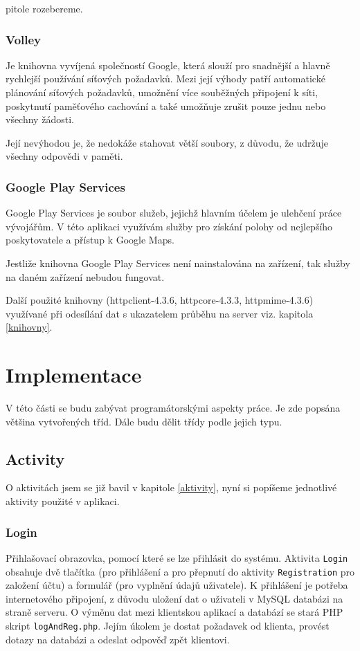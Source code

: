 \documentclass[12pt]{article}
\begin{document}
pitole rozebereme.
\subsubsection{Volley}
\label{volley}
Je knihovna vyvíjená společností Google, která slouží pro snadnější a hlavně rychlejší používání síťových požadavků. Mezi její výhody patří automatické plánování síťových požadavků, umožnění více souběžných připojení k síti, poskytnutí paměťového cachování a také umožňuje zrušit pouze jednu nebo všechny žádosti.

Její nevýhodou je, že nedokáže stahovat větší soubory, z důvodu, že udržuje všechny odpovědi v paměti.\cite{volley}
\subsubsection{Google Play Services}
Google Play Services je soubor služeb, jejichž hlavním účelem je ulehčení práce vývojářům. V této aplikaci využívám služby pro získání polohy od nejlepšího poskytovatele a přístup k Google Maps.

Jestliže knihovna Google Play Services není nainstalována na zařízení, tak služby na daném zařízení nebudou fungovat.\cite{services}


Další použité knihovny (httpclient-4.3.6, httpcore-4.3.3, httpmime-4.3.6) využívané při odesílání dat s ukazatelem průběhu na server viz. kapitola \ref{knihovny}.
\newpage
\section{Implementace}
V této části se budu zabývat programátorskými aspekty práce. Je zde popsána většina vytvořených tříd. Dále budu dělit třídy podle jejich typu.
\subsection{Activity}
O aktivitách jsem se již bavil v kapitole \ref{aktivity}, nyní si popíšeme jednotlivé aktivity použité v aplikaci.
\subsubsection{Login}
Přihlašovací obrazovka, pomocí které se lze přihlásit do systému. Aktivita \verb+Login+ obsahuje dvě tlačítka (pro přihlášení a pro přepnutí do aktivity \verb+Registration+ pro založení účtu) a formulář (pro vyplnění údajů uživatele). K přihlášení je potřeba internetového připojení, z důvodu uložení dat o uživateli v MySQL databázi na straně serveru. O výměnu dat mezi klientskou aplikací a databází se stará PHP skript \verb+logAndReg.php+. Jejím úkolem je dostat požadavek od klienta, provést dotazy na databázi a odeslat odpověď zpět klientovi.
\end{document}
